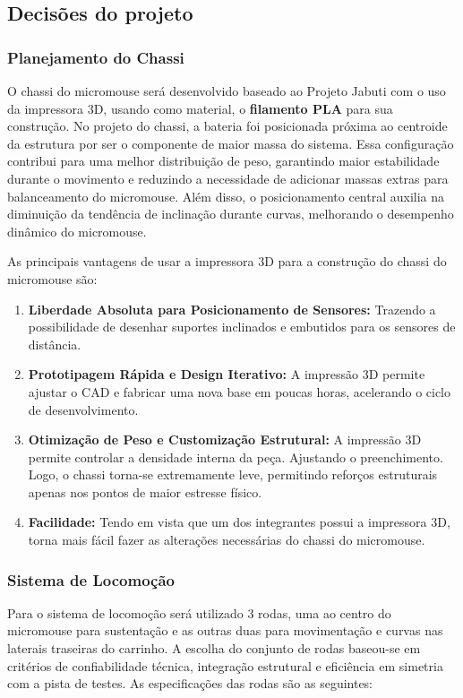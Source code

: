 \subsection{Decisões do projeto}

\subsubsection{Planejamento do Chassi}
O chassi do micromouse será desenvolvido baseado ao Projeto Jabuti \cite{Projeto_Jabuti} com o uso da impressora 3D, usando como material, o \textbf{filamento PLA} para sua construção. No projeto do chassi, a bateria foi posicionada próxima ao centroide da estrutura por ser o componente de maior massa do sistema. Essa configuração contribui para uma melhor distribuição de peso, garantindo maior estabilidade durante o movimento e reduzindo a necessidade de adicionar massas extras para balanceamento do micromouse. Além disso, o posicionamento central auxilia na diminuição da tendência de inclinação durante curvas, melhorando o desempenho dinâmico do micromouse.

As principais vantagens de usar a impressora 3D para a construção do chassi do micromouse são:

\begin{enumerate}
    \item \textbf{Liberdade Absoluta para Posicionamento de Sensores:} Trazendo a possibilidade de desenhar suportes inclinados e embutidos para os sensores de distância.
    
    \item \textbf{Prototipagem Rápida e Design Iterativo:} A impressão 3D permite ajustar o CAD e fabricar uma nova base em poucas horas, acelerando o ciclo de desenvolvimento.
    
    \item \textbf{Otimização de Peso e Customização Estrutural:} A impressão 3D permite controlar a densidade interna da peça. Ajustando o preenchimento. Logo, o chassi torna-se extremamente leve, permitindo reforços estruturais apenas nos pontos de maior estresse físico.

    \item \textbf{Facilidade:} Tendo em vista que um dos integrantes possui a impressora 3D, torna mais fácil fazer as alterações necessárias do chassi do micromouse.
\end{enumerate}

\subsubsection{Sistema de Locomoção}
Para o sistema de locomoção será utilizado 3 rodas, uma ao centro do micromouse para sustentação e as outras duas para movimentação e curvas nas laterais traseiras do carrinho. A escolha do conjunto de rodas baseou-se em critérios de confiabilidade técnica, integração estrutural e eficiência em simetria com a pista de testes. As especificações das rodas são as seguintes:

